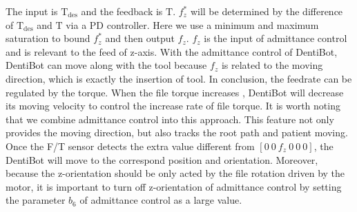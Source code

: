 The input is $\mathrm{T_{des}}$ and the feedback is $\mathrm{T}$. $f^*_z$ will be determined by the difference of $\mathrm{T_{des}}$ and $\mathrm{T}$ via a PD controller. Here we use a minimum and maximum saturation to bound $f^*_z$ and then output $f_z$. $f_z$ is the input of admittance control and is relevant to  the feed of z-axis. With the admittance control of DentiBot, DentiBot can move along with the tool because $f_z$ is related to the moving direction, which is exactly the insertion of tool. In conclusion, the feedrate can be regulated by the torque. When the file torque increases , DentiBot will decrease its moving velocity to control the increase rate of file torque.  It is worth noting that we combine admittance control into this approach. This feature not only provides the moving direction, but also tracks the root path and patient moving. Once the F/T sensor detects the extra value different from $[0\ 0\ f_z\ 0\ 0\ 0]$, the DentiBot will move to the correspond position and orientation. Moreover, because the z-orientation should be only acted by the file rotation driven by the motor, it is important to turn off z-orientation of admittance control by setting the parameter $b_6$ of admittance control as a large value.

